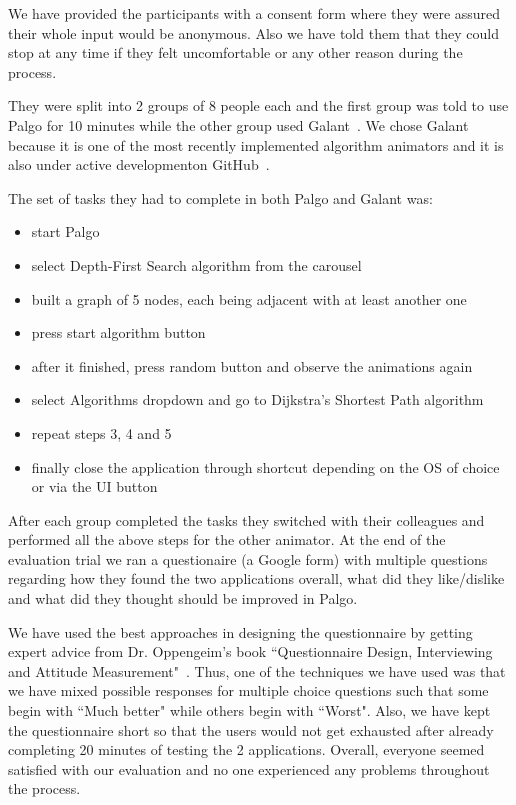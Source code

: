 \documentclass{l4proj}
\begin{document}
We have provided the participants with a consent form where they were assured their whole input would be anonymous.
Also we have told them that they could stop at any time if they felt uncomfortable or any other reason during the
process.

They were split into 2 groups of 8 people each and the first group was told to use Palgo for 10 minutes while the
other group used Galant~\cite{galant}. We chose Galant because it is one of the most recently implemented algorithm
animators and it is also under active developmenton GitHub~\cite{galant-github}.

The set of tasks they had to complete in both Palgo and Galant was:

\begin{itemize}
  \item start Palgo
  \item select Depth-First Search algorithm from the carousel
  \item built a graph of 5 nodes, each being adjacent with at least another one
  \item press start algorithm button
  \item after it finished, press random button and observe the animations again
  \item select Algorithms dropdown and go to Dijkstra's Shortest Path algorithm
  \item repeat steps 3, 4 and 5
  \item finally close the application through shortcut depending on the OS of choice or via the UI button
\end{itemize}

After each group completed the tasks they switched with their colleagues and performed all the above steps for the other
animator. At the end of the evaluation trial we ran a questionaire (a Google form) with multiple questions regarding how
they found the two applications overall, what did they like/dislike and what did they thought should be improved in
Palgo. 

We have used the best approaches in designing the questionnaire by getting expert advice from Dr. Oppengeim's book
``Questionnaire Design, Interviewing and Attitude Measurement"~\cite{questionnaire-design}. Thus, one of the techniques
we have used was that we have mixed possible
responses for multiple choice questions such that some begin with ``Much better" while others begin with ``Worst". Also, we have
kept the questionnaire short so that the users would not get exhausted after already completing 20 minutes of testing
the 2 applications. Overall, everyone seemed satisfied with our evaluation and no one experienced any problems throughout the process.
\end{document}
